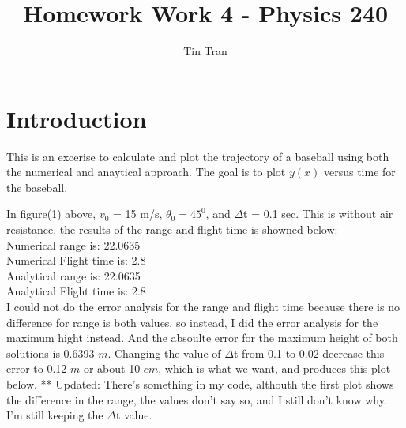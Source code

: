 \documentclass{article}
\begin{document}
\title{Homework Work 4 - Physics 240}
\author{Tin Tran}

\maketitle

\section{Introduction}

This is an excerise to calculate and plot the trajectory of a baseball using both the numerical and anaytical approach. The goal is to plot $y(x)$ versus time for the baseball.


\begin{figure}[H]
\end{figure}
In figure(1) above, $v_0$ = 15 m/s, $\theta_0 = 45^0$, and $\Delta$t = 0.1 sec. This is without air resistance, the results of the range and flight time is showned below:  \\
Numerical range is:  22.0635\\
Numerical Flight time is:  2.8\\
Analytical range is:  22.0635\\
Analytical Flight time is:  2.8\\

I could not do the error analysis for the range and flight time because there is no difference for range is both values, so instead, I did the error analysis for the maximum hight instead. And the absoulte error for the maximum height of both solutions is 0.6393 $m$. Changing the value of $\Delta$t from 0.1 to 0.02 decrease this error to 0.12 $m$ or about 10 $cm$, which is what we want, and produces this plot below.
** Updated: There's something in my code, althouth the first plot shows the difference in the range, the values don't say so, and I still don't know why. I'm still keeping the $\Delta$t value.
\end{document}

